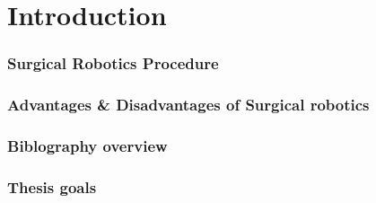 \section{Introduction}

\begin{frame}
\frametitle{Surgical Robotics Procedure}
\end{frame}

\begin{frame}
\frametitle{Advantages \& Disadvantages of Surgical robotics}
\end{frame}

\begin{frame}
\frametitle{Biblography overview}
\end{frame}

\begin{frame}
\frametitle{Thesis goals}
\end{frame}
